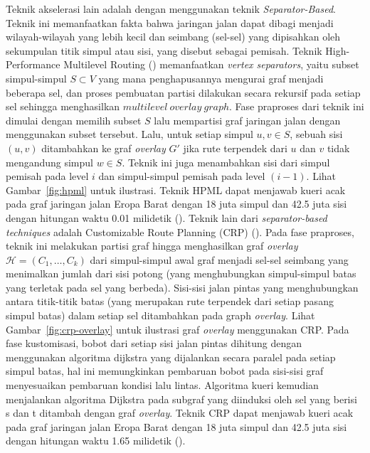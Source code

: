 Teknik akselerasi lain adalah dengan menggunakan teknik \textit{Separator-Based}. Teknik ini memanfaatkan fakta bahwa jaringan jalan dapat dibagi menjadi wilayah-wilayah yang lebih kecil dan seimbang (sel-sel) yang dipisahkan oleh sekumpulan titik simpul atau sisi, yang disebut sebagai pemisah. Teknik High-Performance Multilevel Routing (\cite{DellingHPML}) memanfaatkan \textit{vertex separators}, yaitu subset simpul-simpul $S\subset V$ yang mana penghapusannya mengurai graf menjadi beberapa sel, dan proses pembuatan partisi dilakukan secara rekursif pada setiap sel sehingga menghasilkan $multilevel \ overlay \ graph$. Fase praproses dari teknik ini dimulai dengan memilih subset $S$ lalu mempartisi graf jaringan jalan dengan menggunakan subset tersebut. Lalu, untuk setiap simpul $u,v\in S$, sebuah sisi $(u,v)$ ditambahkan ke graf \textit{overlay} $G'$ jika rute terpendek dari $u$ dan $v$ tidak mengandung simpul $w\in S$. Teknik ini juga menambahkan sisi dari simpul pemisah pada level $i$ dan simpul-simpul pemisah pada level $(i-1)$. Lihat Gambar~\ref{fig:hpml} untuk ilustrasi. Teknik HPML dapat menjawab kueri acak pada graf jaringan jalan Eropa Barat dengan 18 juta simpul dan 42.5 juta sisi dengan hitungan waktu 0.01 milidetik (\cite{Bast2015}). Teknik lain dari \textit{separator-based techniques} adalah Customizable Route Planning (CRP) (\cite{Delling2015}). Pada fase praproses, teknik ini melakukan partisi graf hingga menghasilkan graf \textit{overlay} $\mathcal{H}=(C_1,\ldots,C_k)$ dari simpul-simpul awal graf menjadi sel-sel seimbang yang menimalkan jumlah dari sisi potong (yang menghubungkan simpul-simpul batas yang terletak pada sel yang berbeda). Sisi-sisi jalan pintas yang menghubungkan antara titik-titik batas (yang merupakan rute terpendek dari setiap pasang simpul batas) dalam setiap sel ditambahkan pada graph \textit{overlay}. Lihat Gambar~\ref{fig:crp-overlay} untuk ilustrasi graf \textit{overlay} menggunakan CRP. Pada fase kustomisasi, bobot dari setiap sisi jalan pintas dihitung dengan menggunakan algoritma dijkstra yang dijalankan secara paralel pada setiap simpul batas, hal ini memungkinkan pembaruan bobot pada sisi-sisi graf menyesuaikan pembaruan kondisi lalu lintas. Algoritma kueri kemudian menjalankan algoritma Dijkstra pada subgraf yang diinduksi oleh sel yang berisi s dan t ditambah dengan graf \textit{overlay}. Teknik CRP dapat menjawab kueri acak pada graf jaringan jalan Eropa Barat dengan 18 juta simpul dan 42.5 juta sisi dengan hitungan waktu 1.65 milidetik (\cite{Delling2015}).



